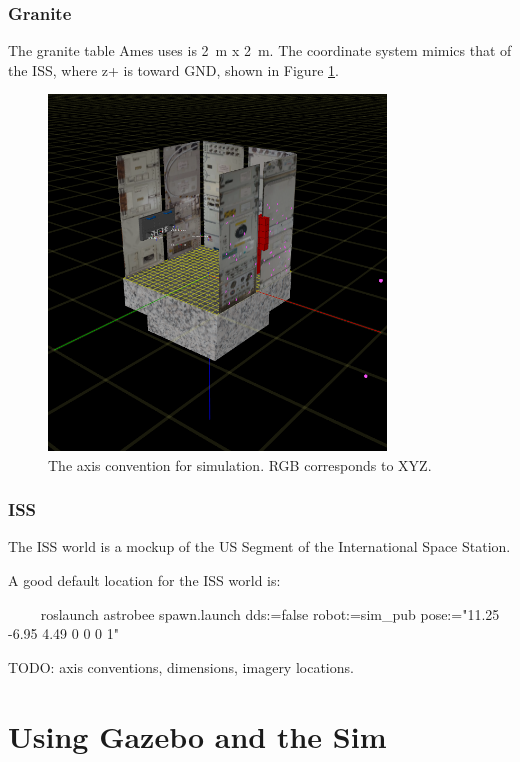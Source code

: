 \documentclass{article}
\begin{document}
\subsubsection{Granite}
The granite table Ames uses is 2\ m x 2\ m. The coordinate system mimics that of the ISS, where z+ is toward GND, shown in Figure \ref{fig:sim_axes}.

\begin{figure}[h!]
    \centering
    \includegraphics[width=0.8\textwidth]{img/sim_axes.png}
    \caption{The axis convention for simulation. RGB corresponds to XYZ.}
    \label{fig:sim_axes}
\end{figure}

\subsubsection{ISS}
The ISS world is a mockup of the US Segment of the International Space Station.

A good default location for the ISS world is:
\begin{markdown}
~~~~
roslaunch astrobee spawn.launch dds:=false
robot:=sim_pub pose:="11.25 -6.95 4.49 0 0 0 1" 
~~~~~
\end{markdown}

TODO: axis conventions, dimensions, imagery locations.


\section{Using Gazebo and the Sim}
\end{document}
